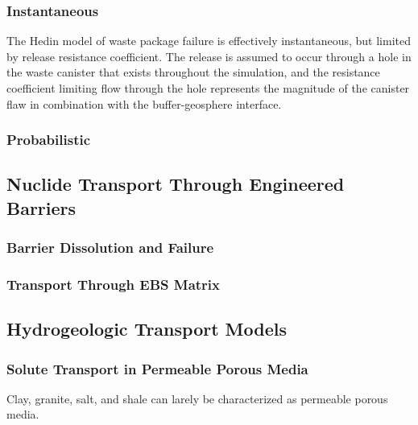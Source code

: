 \subsubsection{Instantaneous}
 
The Hedin model of waste package failure is effectively instantaneous, 
but limited by release resistance coefficient. The release is assumed  
to occur through a hole in the waste canister that exists throughout 
the simulation, and the resistance coefficient limiting flow through 
the hole represents the magnitude of the canister flaw in combination
with the buffer-geosphere interface.  \cite{hedin_integrated_2002}

\subsubsection{Probabilistic}


\subsection{Nuclide Transport Through Engineered Barriers}

\subsubsection{Barrier Dissolution and Failure}

\subsubsection{Transport Through EBS Matrix}



\subsection{Hydrogeologic Transport Models}

\subsubsection{Solute Transport in Permeable Porous Media}
Clay, granite, salt, and shale can larely be characterized as 
permeable porous media.

%

